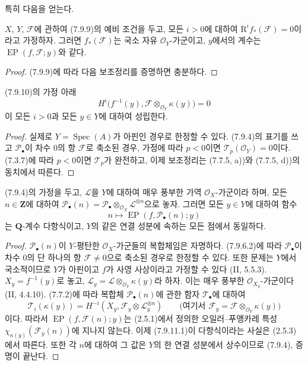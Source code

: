특히 다음을 얻는다.

\begin{corollary}[7.9.10]
\label{III.7.9.10.fr}
$X$, $Y$, $\mathscr F$에 관하여 (7.9.9)의 예비 조건을 두고, 모든
$i>0$에 대하여 $\mathrm R^if_*(\mathscr F)=0$이라고 가정하자. 그러면
$f_*(\mathscr F)$는 국소 자유 $\mathscr O_Y$-가군이고, $y$에서의
계수는 $\operatorname{EP}(f,\mathscr F;y)$와 같다.
\end{corollary}

\begin{proof}
(7.9.9)에 따라 다음 보조정리를 증명하면 충분하다.
\end{proof}

\begin{lemma}[7.9.10.1]
\label{III.7.9.10.1.fr}
(7.9.10)의 가정 아래
\[
  H^i\bigl(f^{-1}(y),
  \mathscr F\otimes_{\mathscr O_Y}\kappa(y)\bigr)=0
\]
이 모든 $i>0$과 모든 $y\in Y$에 대하여 성립한다.
\end{lemma}

\begin{proof}
실제로 $Y=\operatorname{Spec}(A)$가 아핀인 경우로 한정할 수 있다.
(7.9.4)의 표기를 쓰고 $\mathscr P_\bullet$이 차수 $0$의 항
$\mathscr F$로 축소된 경우, 가정에 따라 $p<0$이면
$\mathscr T_p(\mathscr O_Y)=0$이다. (7.3.7)에 따라 $p<0$이면
$\mathscr T_p$가 완전하고, 이제 보조정리는 (7.7.5, a))와 (7.7.5, d))의
동치에서 따른다.
\end{proof}


\begin{proposition}[7.9.11]
\label{III.7.9.11.fr}
(7.9.4)의 가정을 두고, $\mathscr L$을 $Y$에 대하여 매우 풍부한 가역
$\mathscr O_X$-가군이라 하며, 모든 $n\in\mathbf Z$에 대하여
$\mathscr P_\bullet(n)=\mathscr P_\bullet\otimes_{\mathscr O_X}
\mathscr L^{\otimes n}$으로 놓자. 그러면 모든 $y\in Y$에 대하여 함수
\[
  n\longmapsto\operatorname{EP}(f,\mathscr P_\bullet(n);y)
  \tag{7.9.11.1}\label{III.7.9.11.1.fr}
\]
는 $\mathbf Q$-계수 다항식이고, $Y$의 같은 연결 성분에 속하는 모든
점에서 동일하다.
\end{proposition}

\begin{proof}
$\mathscr P_\bullet(n)$이 $Y$-평탄한 $\mathscr O_X$-가군들의
복합체임은 자명하다. (7.9.6.2)에 따라 $\mathscr P_\bullet$이 차수
0의 단 하나의 항 $\mathscr F\ne0$으로 축소된 경우로 한정할 수
있다. 또한 문제는 $Y$에서 국소적이므로 $Y$가 아핀이고 $f$가 사영
사상이라고 가정할 수 있다 (II, 5.5.3). $X_y=f^{-1}(y)$로 놓고,
$\mathscr L_y=\mathscr L\otimes_{\mathscr O_Y}\kappa(y)$라 하자. 이는 매우
풍부한 $\mathscr O_{X_y}$-가군이다 (II, 4.4.10).
(7.7.2)에 따라 복합체 $\mathscr P_\bullet(n)$에 관한 함자
$\mathscr T_\bullet$에 대하여
\[
  \mathscr T_i(\kappa(y))
  =H^{-i}(X_y,\mathscr F_y\otimes\mathscr L_y^{\otimes n})
  \qquad
  \bigl(\text{여기서 }\mathscr F_y=\mathscr F\otimes_{\mathscr O_Y}\kappa(y)\bigr)
\]
이다. 따라서 $\operatorname{EP}(f,\mathscr F(n);y)$는 (2.5.1)에서
정의한 오일러--푸앵카레 특성
$\chi_{\kappa(y)}(\mathscr F_y(n))$에 지나지 않는다. 이제 (7.9.11.1)이
다항식이라는 사실은 (2.5.3)에서 따른다. 또한 각 $n$에 대하여 그 값은
$Y$의 한 연결 성분에서 상수이므로 (7.9.4), 증명이 끝난다.
\end{proof}

